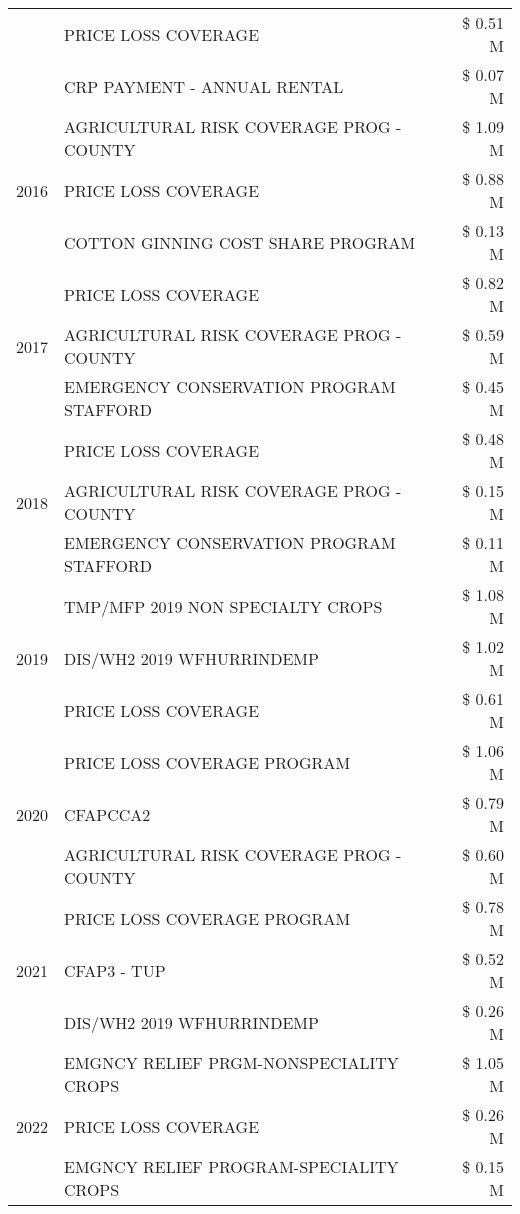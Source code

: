 \begin{tabular}{llr}
 & PRICE LOSS COVERAGE & \$ 0.51 M \\
 & CRP PAYMENT - ANNUAL RENTAL & \$ 0.07 M \\
\cline{1-3}
\multirow[t]{3}{*}{2016} & AGRICULTURAL RISK COVERAGE PROG - COUNTY & \$ 1.09 M \\
 & PRICE LOSS COVERAGE & \$ 0.88 M \\
 & COTTON GINNING COST SHARE PROGRAM & \$ 0.13 M \\
\cline{1-3}
\multirow[t]{3}{*}{2017} & PRICE LOSS COVERAGE & \$ 0.82 M \\
 & AGRICULTURAL RISK COVERAGE PROG - COUNTY & \$ 0.59 M \\
 & EMERGENCY CONSERVATION PROGRAM STAFFORD & \$ 0.45 M \\
\cline{1-3}
\multirow[t]{3}{*}{2018} & PRICE LOSS COVERAGE & \$ 0.48 M \\
 & AGRICULTURAL RISK COVERAGE PROG - COUNTY & \$ 0.15 M \\
 & EMERGENCY CONSERVATION PROGRAM STAFFORD & \$ 0.11 M \\
\cline{1-3}
\multirow[t]{3}{*}{2019} & TMP/MFP 2019 NON SPECIALTY CROPS & \$ 1.08 M \\
 & DIS/WH2 2019 WFHURRINDEMP & \$ 1.02 M \\
 & PRICE LOSS COVERAGE & \$ 0.61 M \\
\cline{1-3}
\multirow[t]{3}{*}{2020} & PRICE LOSS COVERAGE PROGRAM & \$ 1.06 M \\
 & CFAPCCA2 & \$ 0.79 M \\
 & AGRICULTURAL RISK COVERAGE PROG - COUNTY & \$ 0.60 M \\
\cline{1-3}
\multirow[t]{3}{*}{2021} & PRICE LOSS COVERAGE PROGRAM & \$ 0.78 M \\
 & CFAP3 - TUP & \$ 0.52 M \\
 & DIS/WH2 2019 WFHURRINDEMP & \$ 0.26 M \\
\cline{1-3}
\multirow[t]{3}{*}{2022} & EMGNCY RELIEF PRGM-NONSPECIALITY CROPS & \$ 1.05 M \\
 & PRICE LOSS COVERAGE & \$ 0.26 M \\
 & EMGNCY RELIEF PROGRAM-SPECIALITY CROPS & \$ 0.15 M \\
\cline{1-3}
\bottomrule
\end{tabular}
